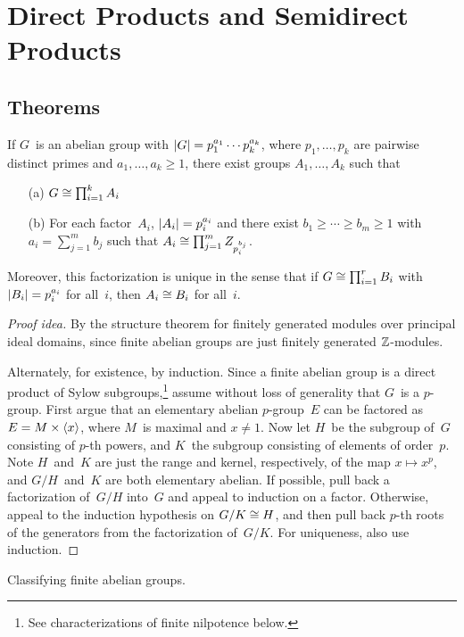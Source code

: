 %
%
%
\section{Direct Products and Semidirect Products}
\subsection*{Theorems}
\begin{thm}
If \(G\)~is an abelian group with \(|{G}|=p_1^{a_1}\cdots p_k^{a_k}\), where \(p_1,\ldots,p_k\) are pairwise distinct primes and \(a_1,\ldots,a_k\ge1\), there exist groups \(A_1,\ldots,A_k\) such that
\begin{enumerate}[itemsep=0pt]
\item[(a)] \(G\cong\prod_{i=1}^k A_i\)
\item[(b)] For each factor~\(A_i\), \(|{A_i}|=p_i^{a_i}\) and there exist \(b_1\ge\cdots\ge b_m\ge 1\) with \(a_i=\sum_{j=1}^m b_j\) such that \(A_i\cong\prod_{j=1}^m Z_{p_i^{b_j}}\).
\end{enumerate}
Moreover, this factorization is unique in the sense that if \(G\cong\prod_{i=1}^r B_i\) with \(|{B_i}|=p_i^{a_i}\) for all~\(i\), then \(A_i\cong B_i\) for all~\(i\).
\end{thm}
\begin{proof}[Proof idea]
By the structure theorem for finitely generated modules over principal ideal domains, since finite abelian groups are just finitely generated \(\mathbb{Z}\)-modules.

Alternately, for existence, by induction. Since a finite abelian group is a direct product of Sylow subgroups,\footnote{See characterizations of finite nilpotence below.} assume without loss of generality that \(G\)~is a \(p\)-group. First argue that an elementary abelian \(p\)-group~\(E\) can be factored as \(E=M\times\langle{x}\rangle\), where \(M\)~is maximal and \(x\ne1\). Now let \(H\)~be the subgroup of~\(G\) consisting of \(p\)-th powers, and \(K\)~the subgroup consisting of elements of order~\(p\). Note \(H\)~and~\(K\) are just the range and kernel, respectively, of the map \(x\mapsto x^p\), and \(G/H\)~and~\(K\) are both elementary abelian. If possible, pull back a factorization of~\(G/H\) into~\(G\) and appeal to induction on a factor. Otherwise, appeal to the induction hypothesis on \(G/K\cong H\), and then pull back \(p\)-th roots of the generators from the factorization of~\(G/K\). For uniqueness, also use induction.
\end{proof}
\begin{app}
Classifying finite abelian groups.
\end{app}

